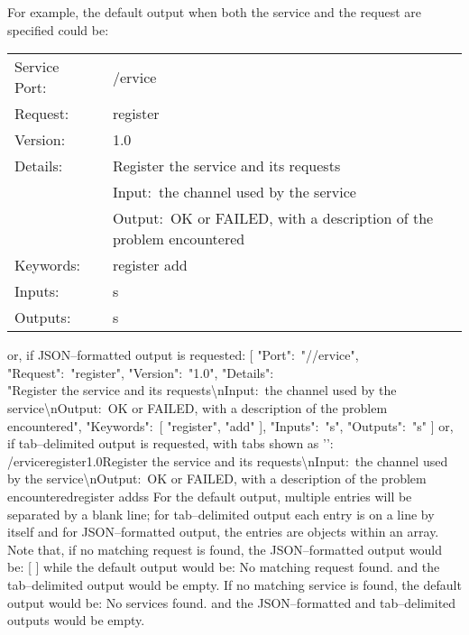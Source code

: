 For example, the default output when both the service and the request are specified could
be:
\outputBegin{}
\begin{tabular}{lp{12.75cm}}
Service Port:\ & /\textdollar{}ervice\\
Request:\ & register\\
Version:\ & 1.0\\
Details:\ & Register the service and its requests\\
 & Input:\ the channel used by the service\\
 & Output:\ OK or FAILED, with a description of the problem encountered\\
Keywords:\ & register add\\
Inputs:\ & s\\
Outputs:\ & s\\
\end{tabular}
\outputEnd{}
or, if JSON--formatted output is requested:
\outputBegin{}
[ \textbraceleft{} "Port":\ "//\textdollar{}ervice", "Request":\ "register",
"Version":\ "1.0", "Details":\ \\
"Register the service and its requests\textbackslash{}nInput:\ the channel used by the\\
service\textbackslash{}nOutput:\ OK or FAILED, with a description of the problem
encountered", "Keywords":\ [ "register", "add" ], "Inputs":\ "s", "Outputs":\ "s"
\textbraceright{} ]
\outputEnd{}
or, if tab--delimited output is requested, with tabs shown as
'\texttt{\boldmath{$\vdash$}}':
\outputBegin{}
/\textdollar{}ervice\pseudotab{}register\pseudotab{}1.0\pseudotab{}Register the service
and its requests\textbackslash{}nInput:\ the channel used by the
service\textbackslash{}nOutput:\ OK or FAILED, with a description of the problem\\
encountered\pseudotab{}register add\pseudotab{}s\pseudotab{}s
\outputEnd{}
For the default output, multiple entries will be separated by a blank line; for
tab--delimited output each entry is on a line by itself and for JSON--formatted output,
the entries are objects within an array.
Note that, if no matching request is found, the JSON--formatted output would be:
\outputBegin{}
[  ]
\outputEnd{}
while the default output would be:
\outputBegin{}
No matching request found.
\outputEnd{}
and the tab--delimited output would be empty.
If no matching service is found, the default output would be:
\outputBegin{}
No services found.
\outputEnd{}
and the JSON--formatted and tab--delimited outputs would be empty.
